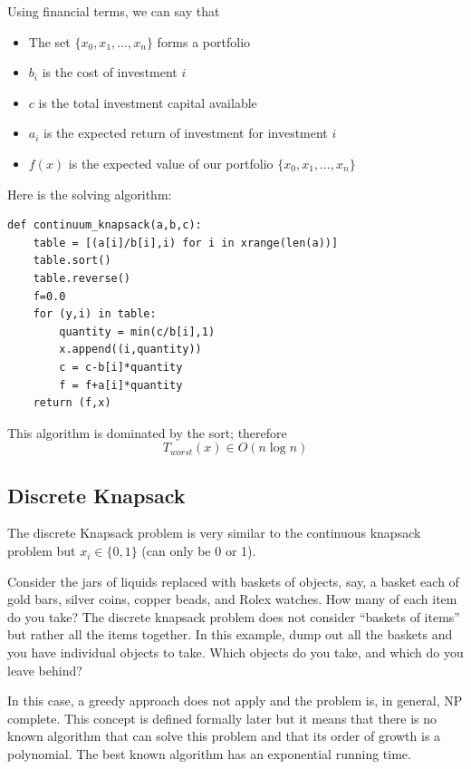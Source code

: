 \documentclass[justified,sixbynine]{tufte-book}
\def\ft{\small\tt}
\theoremstyle{plain}%
\theoremstyle{definition}
\theoremstyle{remark}
\begin{document}
\begin{fullwidth}
Using financial terms, we can say that

\begin{itemize}
\item  The set $\{x_0,x_1,\dots,x_n\}$ forms a portfolio

\item  $b_i$ is the cost of investment $i$

\item  $c$ is the total investment capital available

\item  $a_i$ is the expected return of investment for investment $i$

\item  $f(x)$ is the expected value of our portfolio $\{x_0,x_1,\dots,x_n\}$
\end{itemize}

Here is the solving algorithm:

\begin{lstlisting}[caption={in file: {\ft nlib.py}}]
def continuum_knapsack(a,b,c):
    table = [(a[i]/b[i],i) for i in xrange(len(a))]
    table.sort()
    table.reverse()
    f=0.0
    for (y,i) in table:
        quantity = min(c/b[i],1)
        x.append((i,quantity))
        c = c-b[i]*quantity
        f = f+a[i]*quantity
    return (f,x)
\end{lstlisting}

This algorithm is dominated by the sort; therefore
\begin{equation}
T_{worst}(x)\in O(n\log n)
\end{equation}

\subsection{Discrete Knapsack}

The discrete Knapsack problem is very similar to the continuous knapsack
problem but $x_i\in \{0,1\}$ (can only be 0 or 1).

Consider the jars of liquids replaced with baskets of objects, say, a basket each of gold bars, silver coins, copper beads, and Rolex watches.  How many of each item do you take?  The discrete knapsack problem does not consider ``baskets of items'' but rather all the items together.  In this example, dump out all the baskets and you have individual objects to take.  Which objects do you take, and which do you leave behind?

In this case, a greedy approach does not apply and the problem is, in general,
NP complete. This concept is defined formally later but it means that there is no known algorithm that can solve this problem and that its order of growth is a polynomial. The best known algorithm has an exponential running time.


\end{fullwidth}
\end{document}
